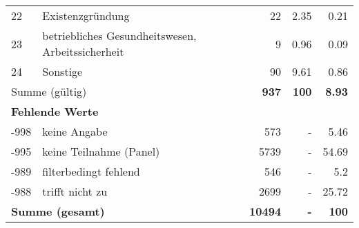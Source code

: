 \begin{longtable}{lXrrr}
        22 & \multicolumn{1}{X}{Existenzgründung} & %
          \num{22} &
          \num[round-mode=places,round-precision=2]{2,35} &
          \num[round-mode=places,round-precision=2]{0,21} \\

        23 & \multicolumn{1}{X}{betriebliches Gesundheitswesen, Arbeitssicherheit} & %
          \num{9} &
          \num[round-mode=places,round-precision=2]{0,96} &
          \num[round-mode=places,round-precision=2]{0,09} \\

        24 & \multicolumn{1}{X}{Sonstige} & %
          \num{90} &
          \num[round-mode=places,round-precision=2]{9,61} &
          \num[round-mode=places,round-precision=2]{0,86} \\

     \midrule
     \multicolumn{2}{l}{Summe (gültig)} &
       \textbf{\num{937}} &
     \textbf{100} &
       \textbf{\num[round-mode=places,round-precision=2]{8,93}} \\
     \multicolumn{5}{l}{\textbf{Fehlende Werte}}\\
       -998 &
       keine Angabe &
         \num{573} &
        - &
         \num[round-mode=places,round-precision=2]{5,46} \\
       -995 &
       keine Teilnahme (Panel) &
         \num{5739} &
        - &
         \num[round-mode=places,round-precision=2]{54,69} \\
       -989 &
       filterbedingt fehlend &
         \num{546} &
        - &
         \num[round-mode=places,round-precision=2]{5,2} \\
       -988 &
       trifft nicht zu &
         \num{2699} &
        - &
         \num[round-mode=places,round-precision=2]{25,72} \\
     \midrule
     \multicolumn{2}{l}{\textbf{Summe (gesamt)}} &
          \textbf{\num{10494}} &
        \textbf{-} &
        \textbf{100} \\
     \bottomrule
     \end{longtable}
     
